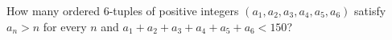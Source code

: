 How many ordered $6$-tuples of positive integers $(a_1,a_2,a_3,a_4,a_5,a_6)$ satisfy $a_n>n$ for every $n$ and $a_1+a_2+a_3+a_4+a_5+a_6<150$?
